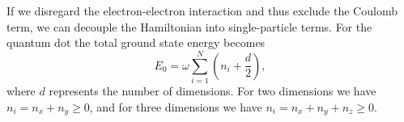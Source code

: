 		If we disregard the electron-electron interaction and thus exclude the Coulomb term, we can decouple the Hamiltonian into single-particle terms. For the quantum dot the total ground state energy becomes \cite{griffiths05}
		\begin{equation} \label{eq:spGroundStateEnergy}
			E_{0}=\omega\sum_{i=1}^{N}\left(n_{i}+\frac{d}{2}\right),
		\end{equation}
		where $d$ represents the number of dimensions. For two dimensions we have $n_i=n_x+n_y\geq 0$, and for three dimensions we have $n_i=n_x+n_y+n_z\geq 0$.
